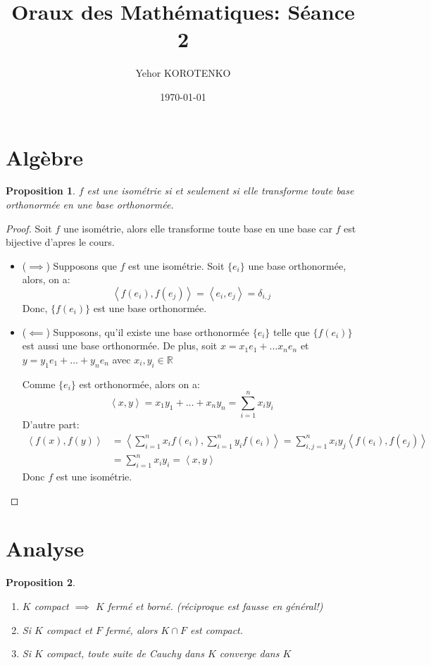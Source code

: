 \documentclass[a4paper]{article}
\title{Oraux des Mathématiques: Séance 2}
\author{Yehor KOROTENKO}
\date{\today}
\newcommand{\R}{\mathbb{R}}
\newtheorem{prop}{Proposition}[section]
\newcommand{\scalair}[1]{\left\langle #1 \right\rangle}
\begin{document}
\section{Algèbre}
\begin{prop}\label{prop:isometrie-ssi-transforme-bon-en-bon}
   $f$ est une isométrie si et seulement si elle transforme toute base orthonormée en une base orthonormée. 
\end{prop}
\begin{proof}
    Soit $f$ une isométrie, alors elle transforme toute base en une base car  $f$ est bijective d'apres le cours.
    \begin{itemize}
        \item ($\implies$) Supposons que $f$ est une isométrie. Soit $\{e_i\}$ une base orthonormée, alors, on a:
             \[
                 \scalair{f(e_i), f(e_j)} = \scalair{e_i, e_j} = \delta_{i,j}
            \] 
            Donc, $\{f(e_i)\}$ est une base orthonormée.
        \item ($\impliedby$) Supposons, qu'il existe une base orthonormée $\{e_i\}$ telle que  $\{f(e_i)\}$ est aussi une base orthonormée. De plus, soit  $x = x_1e_1 + \ldots x_ne_n$ et $y = y_1e_1 + \ldots + y_ne_n$ avec $x_i, y_i \in \R$
            \par
            Comme $\{e_i\}$ est orthonormée, alors on a:
            \begin{equation}
                \scalair{x, y} = x_1y_1 + \ldots + x_ny_n = \sum_{i=1}^{n} x_iy_i
            \end{equation}
            D'autre part:
            \begin{align*}
                \scalair{f(x), f(y)} &= \scalair{\sum_{i=1}^{n} x_if(e_i), \sum_{i=1}^{n} y_if(e_i)} = \sum_{i,j = 1}^{n} x_iy_j\scalair{f(e_i), f(e_j)}\\
                                     &= \sum_{i=1}^{n} x_iy_i = \scalair{x, y}
            \end{align*}
            Donc $f$ est une isométrie.
    \end{itemize}
\end{proof}

\section{Analyse}
\begin{prop}
    \begin{enumerate}
        \item $K$ compact $\implies$ $K$ fermé et borné. (réciproque est fausse en général!)
        \item Si $K$ compact et $F$ fermé, alors  $K \cap F$ est compact.
        \item Si $K$ compact, toute suite de Cauchy dans  $K$ converge dans  $K$
    \end{enumerate}
\end{prop}
\end{document}
